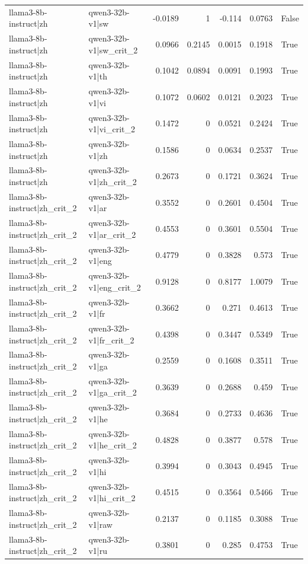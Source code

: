 \begin{table}
\begin{tabular}{l l r r r r l}
llama3-8b-instruct|zh & qwen3-32b-v1|sw & -0.0189 & 1 & -0.114 & 0.0763 & False \\
llama3-8b-instruct|zh & qwen3-32b-v1|sw_crit_2 & 0.0966 & 0.2145 & 0.0015 & 0.1918 & True \\
llama3-8b-instruct|zh & qwen3-32b-v1|th & 0.1042 & 0.0894 & 0.0091 & 0.1993 & True \\
llama3-8b-instruct|zh & qwen3-32b-v1|vi & 0.1072 & 0.0602 & 0.0121 & 0.2023 & True \\
llama3-8b-instruct|zh & qwen3-32b-v1|vi_crit_2 & 0.1472 & 0 & 0.0521 & 0.2424 & True \\
llama3-8b-instruct|zh & qwen3-32b-v1|zh & 0.1586 & 0 & 0.0634 & 0.2537 & True \\
llama3-8b-instruct|zh & qwen3-32b-v1|zh_crit_2 & 0.2673 & 0 & 0.1721 & 0.3624 & True \\
llama3-8b-instruct|zh_crit_2 & qwen3-32b-v1|ar & 0.3552 & 0 & 0.2601 & 0.4504 & True \\
llama3-8b-instruct|zh_crit_2 & qwen3-32b-v1|ar_crit_2 & 0.4553 & 0 & 0.3601 & 0.5504 & True \\
llama3-8b-instruct|zh_crit_2 & qwen3-32b-v1|eng & 0.4779 & 0 & 0.3828 & 0.573 & True \\
llama3-8b-instruct|zh_crit_2 & qwen3-32b-v1|eng_crit_2 & 0.9128 & 0 & 0.8177 & 1.0079 & True \\
llama3-8b-instruct|zh_crit_2 & qwen3-32b-v1|fr & 0.3662 & 0 & 0.271 & 0.4613 & True \\
llama3-8b-instruct|zh_crit_2 & qwen3-32b-v1|fr_crit_2 & 0.4398 & 0 & 0.3447 & 0.5349 & True \\
llama3-8b-instruct|zh_crit_2 & qwen3-32b-v1|ga & 0.2559 & 0 & 0.1608 & 0.3511 & True \\
llama3-8b-instruct|zh_crit_2 & qwen3-32b-v1|ga_crit_2 & 0.3639 & 0 & 0.2688 & 0.459 & True \\
llama3-8b-instruct|zh_crit_2 & qwen3-32b-v1|he & 0.3684 & 0 & 0.2733 & 0.4636 & True \\
llama3-8b-instruct|zh_crit_2 & qwen3-32b-v1|he_crit_2 & 0.4828 & 0 & 0.3877 & 0.578 & True \\
llama3-8b-instruct|zh_crit_2 & qwen3-32b-v1|hi & 0.3994 & 0 & 0.3043 & 0.4945 & True \\
llama3-8b-instruct|zh_crit_2 & qwen3-32b-v1|hi_crit_2 & 0.4515 & 0 & 0.3564 & 0.5466 & True \\
llama3-8b-instruct|zh_crit_2 & qwen3-32b-v1|raw & 0.2137 & 0 & 0.1185 & 0.3088 & True \\
llama3-8b-instruct|zh_crit_2 & qwen3-32b-v1|ru & 0.3801 & 0 & 0.285 & 0.4753 & True \\

\end{tabular}
\end{table}
